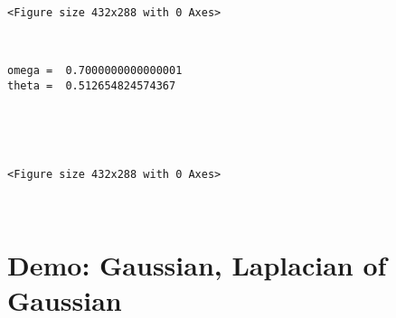 \documentclass[11pt]{article}
\begin{document}
    
    \begin{verbatim}
<Figure size 432x288 with 0 Axes>
    \end{verbatim}

    
    \begin{center}
    \end{center}
    { \hspace*{\fill} \\}
    
    \begin{Verbatim}[commandchars=\\\{\}]
omega =  0.7000000000000001
theta =  0.512654824574367

    \end{Verbatim}

    \begin{center}
    \end{center}
    { \hspace*{\fill} \\}
    
    \begin{center}
    \end{center}
    { \hspace*{\fill} \\}
    
    
    \begin{verbatim}
<Figure size 432x288 with 0 Axes>
    \end{verbatim}

    
    \begin{center}
    \end{center}
    { \hspace*{\fill} \\}
    
    \section{Demo: Gaussian, Laplacian of
Gaussian}\label{demo-gaussian-laplacian-of-gaussian}
\end{document}

